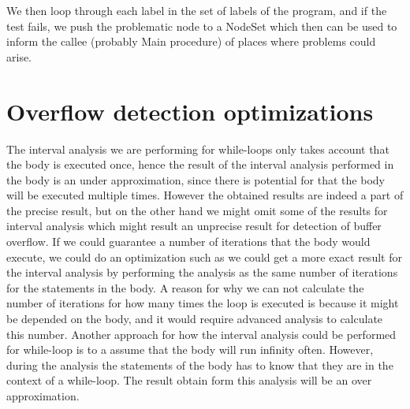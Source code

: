 We then loop through each label in the set of labels of the program, and if the test fails, we push the problematic node to a NodeSet which then can be used to inform the callee (probably Main procedure) of places where problems could arise.

\section{Overflow detection optimizations}
The interval analysis we are performing for while-loops only takes account that the body is executed once, hence the result of the interval analysis performed in the body is an under approximation, since there is potential for that the body will be executed multiple times. However the obtained results are indeed a part of the precise result, but on the other hand we might omit some of the results for interval analysis which might result an unprecise result for detection of buffer overflow.
If we could guarantee a number of iterations that the body would execute, we could do an optimization such as we could get a more exact result for the interval analysis by performing the analysis as the same number of iterations for the statements in the body.   
A reason for why we can not calculate the number of iterations for how many times the loop is executed is because it might be depended on the body, and it would require advanced analysis to calculate this number.
Another approach for how the interval analysis could be performed for while-loop is to a assume that the body will run infinity often. However, during the analysis the statements of the body has to know that they are in the context of a while-loop. The result obtain form this analysis will be an over approximation.




